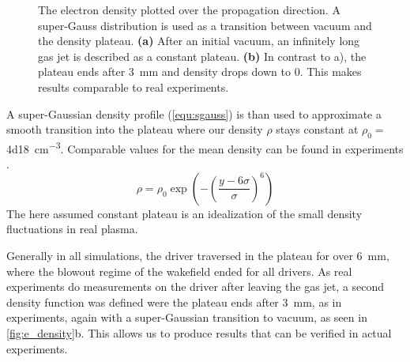 \documentclass[bachelor_thesis]{subfiles}
\begin{document}
\begin{figure}
	\centering
	
	\caption{The electron density plotted over the propagation direction. A super-Gauss distribution is used as a transition between vacuum and the density plateau.
	\textbf{(a)} After an initial vacuum, an infinitely long gas jet is described as a constant plateau.
	\textbf{(b)} In contrast to a), the plateau ends after \qty{3}{\mm} and density drops down to 0. This makes results comparable to real experiments.}
	\label{fig:e_density}
\end{figure}

A super-Gaussian density profile (\autoref{equ:sgauss}) is than used to approximate a smooth transition into the plateau where our density $\rho$ stays constant at $\rho_0 =$ \qty{4d18}{\cm^{-3}}. Comparable values for the mean density can be found in experiments \cite{Schoebel2022, Kurz2021}.
\begin{equation}
	\rho = \rho_0 \exp\left(-\left(\frac{y-6\sigma}{\sigma}\right)^6\right)
	\label{equ:sgauss}
\end{equation}
The here assumed constant plateau is an idealization of the small density fluctuations in real plasma.

Generally in all simulations, the driver traversed in the plateau for over \qty{6}{\mm}, where the blowout regime of the wakefield ended for all drivers. As real experiments do measurements on the driver after leaving the gas jet,
a second density function was defined were the plateau ends after \qty{3}{\mm}, as in experiments, again with a super-Gaussian transition to vacuum, as seen in \autoref{fig:e_density}b.
This allows us to produce results that can be verified in actual experiments.
\end{document}
